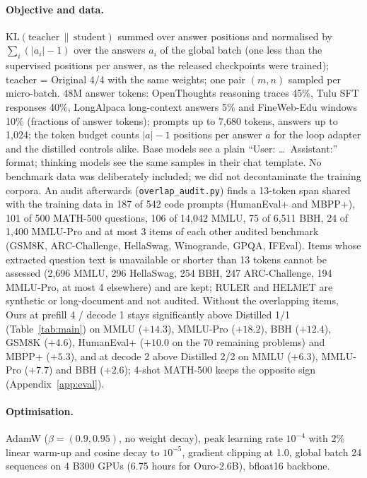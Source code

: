 \documentclass[11pt]{article}
\begin{document}
\paragraph{Objective and data.} $\mathrm{KL}(\text{teacher}\,\|\,\text{student})$ summed over answer positions and
normalised by $\sum_i(|a_i|-1)$ over the answers $a_i$ of the global batch (one less than the supervised
positions per answer, as the released checkpoints were trained); teacher = Original 4/4 with the same weights; one pair $(m,n)$ sampled per
micro-batch. 48M answer tokens: OpenThoughts reasoning traces 45\%, Tulu SFT responses 40\%, LongAlpaca long-context answers
5\% and FineWeb-Edu windows 10\% (fractions of answer tokens); prompts up to 7,680 tokens, answers up to 1,024; the token budget counts $|a|-1$ positions per answer $a$ for the loop
adapter and the distilled controls alike. Base models see
a plain ``User: \ldots\ Assistant:'' format; thinking models see the same samples in their chat template. No benchmark
data was deliberately included; we did not decontaminate the training corpora. An audit afterwards
(\texttt{overlap\_audit.py}) finds a 13-token span shared with the training data in 187 of 542 code prompts (HumanEval+ and MBPP+),
101 of 500 MATH-500 questions, 106 of 14,042 MMLU, 75 of 6,511 BBH, 24 of 1,400 MMLU-Pro and at most 3 items of each
other audited benchmark (GSM8K, ARC-Challenge, HellaSwag, Winogrande, GPQA, IFEval). Items whose extracted question text is unavailable or
shorter than 13 tokens cannot be assessed (2,696 MMLU, 296 HellaSwag, 254 BBH, 247 ARC-Challenge, 194 MMLU-Pro, at
most 4 elsewhere) and are kept; RULER and HELMET are synthetic or long-document and not audited. Without the overlapping items, Ours at prefill 4 /
decode 1 stays significantly above Distilled 1/1 (Table~\ref{tab:main}) on MMLU ($+14.3$), MMLU-Pro ($+18.2$), BBH
($+12.4$), GSM8K ($+4.6$), HumanEval+ ($+10.0$ on the 70 remaining problems) and MBPP+ ($+5.3$), and at decode 2 above
Distilled 2/2 on MMLU ($+6.3$), MMLU-Pro ($+7.7$) and BBH ($+2.6$); 4-shot MATH-500 keeps the opposite sign
(Appendix~\ref{app:eval}).

\paragraph{Optimisation.} AdamW ($\beta=(0.9,0.95)$, no weight decay), peak learning rate $10^{-4}$ with 2\% linear
warm-up and cosine decay to $10^{-5}$, gradient clipping at 1.0, global batch 24 sequences on 4 B300 GPUs (6.75 hours for
Ouro-2.6B), bfloat16 backbone.
\end{document}
